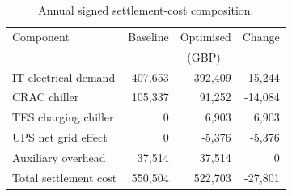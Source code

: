 \begin{table}[!t]
\centering
\caption{Annual signed settlement-cost composition.}
\label{tab:annual-components}
\begin{tabular}{lrrr}
\toprule
Component & Baseline & Optimised & Change \\
 & \multicolumn{3}{c}{(GBP)} \\
\midrule
IT electrical demand & 407,653 & 392,409 & -15,244 \\
CRAC chiller & 105,337 & 91,252 & -14,084 \\
TES charging chiller & 0 & 6,903 & 6,903 \\
UPS net grid effect & 0 & -5,376 & -5,376 \\
Auxiliary overhead & 37,514 & 37,514 & 0 \\
\midrule
Total settlement cost & 550,504 & 522,703 & -27,801 \\
\bottomrule
\end{tabular}
\end{table}
